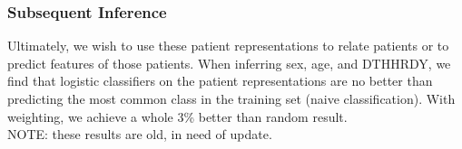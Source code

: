 \documentclass{beamer}
\begin{document}
\begin{frame} \frametitle{Subsequent Inference}
Ultimately, we wish to use these patient representations to relate patients or to predict features of those patients. When inferring sex, age, and DTHHRDY, we find that logistic classifiers on the patient representations are no better than predicting the most common class in the training set (naive classification). With weighting, we achieve a whole 3\% better than random result. \\
NOTE: these results are old, in need of update.
\end{frame}
\end{document}
